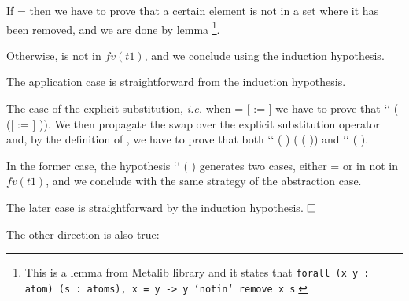 If  =  then we have to prove that a certain element is not in a set where it has been removed, and we are done by lemma \footnote{This is a lemma from Metalib library and it states that {\tt forall (x y : atom) (s : atoms), x = y -> y `notin` remove x s}.}. 
\begin{coqdoccode}
\end{coqdoccode}
Otherwise,  is not in $fv(t1)$, and we conclude using the induction hypothesis.
\begin{coqdoccode}
\end{coqdoccode}
The application case is straightforward from the induction hypothesis.
\begin{coqdoccode}
\end{coqdoccode}
The case of the explicit substitution, {\it i.e.} when  = [ := ] we have to prove that     ``  (   ([ := ] )). We then propagate the swap over the explicit substitution operator and, by the definition of , we have to prove that both     ``  (   ) ( (   )) and     ``  (   ).
\begin{coqdoccode}
\end{coqdoccode}
In the former case, the hypothesis  ``   ( ) generates two cases, either  =  or  in not in $fv(t1)$, and we conclude with the same strategy of the abstraction case.
\begin{coqdoccode}
\end{coqdoccode}
The later case is straightforward by the induction hypothesis. $\hfill\Box$
\begin{coqdoccode}
\coqdocemptyline
\end{coqdoccode}
The other direction is also true:
